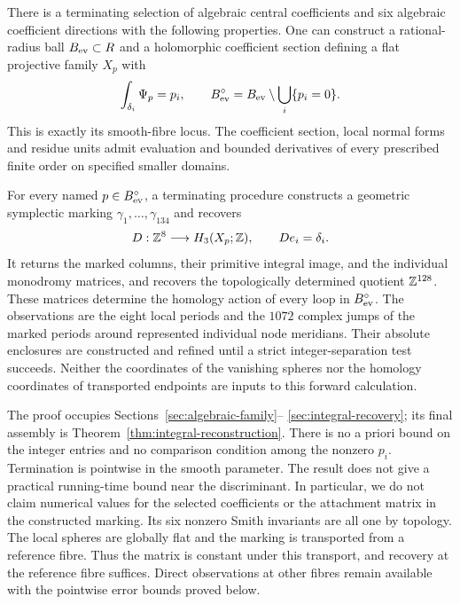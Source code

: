 \begin{theorem}\label{thm:main-reconstruction}
There is a terminating selection of algebraic central
coefficients and six algebraic coefficient directions
with the following properties.
One can construct a rational-radius ball $B_{\rm ev}\subset R$
and a holomorphic coefficient section defining a flat
projective family $X_p$ with
\[
 \int_{\delta_i}\Psi_p=p_i,\qquad
 B_{\rm ev}^{\circ}
       =B_{\rm ev}\setminus\bigcup_i\{p_i=0\}.
\]
This is exactly its smooth-fibre locus.
The coefficient section, local normal forms and residue
units admit evaluation and bounded derivatives of every
prescribed finite order on specified smaller domains.

For every named $p\in B_{\rm ev}^{\circ}$, a terminating
procedure constructs a geometric symplectic marking
$\gamma_1,\ldots,\gamma_{134}$ and recovers
\[
 D:\mathbb Z^8\longrightarrow H_3(X_p;\mathbb Z),\qquad
                        D e_i=\delta_i .
\]
It returns the marked columns, their primitive integral image,
and the individual monodromy matrices, and recovers the
topologically determined quotient $\mathbb Z^{128}$. These matrices determine
the homology action of every loop in $B_{\rm ev}^{\circ}$.
The observations are the eight local periods and the
$1072$ complex jumps of the marked periods around
represented individual node meridians.
Their absolute enclosures are constructed and refined
until a strict integer-separation test succeeds.
Neither the coordinates of the vanishing spheres nor
the homology coordinates of transported endpoints are
inputs to this forward calculation.
\end{theorem}

The proof occupies Sections~\ref{sec:algebraic-family}--%
\ref{sec:integral-recovery}; its final assembly is
Theorem~\ref{thm:integral-reconstruction}.
There is no a priori bound on the integer entries and
no comparison condition among the nonzero $p_i$.
Termination is pointwise in the smooth parameter.
The result does not give a practical running-time
bound near the discriminant. In particular, we do not
claim numerical values for the selected coefficients or
the attachment matrix in the constructed marking. Its six
nonzero Smith invariants are all one by topology.
The local spheres are globally flat and the marking is
transported from a reference fibre. Thus the matrix is constant
under this transport, and recovery at the reference fibre suffices.
Direct observations at other fibres remain available with the
pointwise error bounds proved below.


